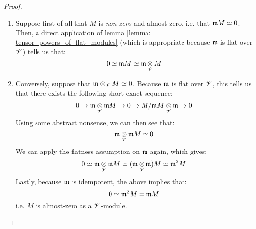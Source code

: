                     \begin{proof}
                        \noindent
                        \begin{enumerate}
                            \item Suppose first of all that $M$ is \textit{non-zero} and almost-zero, i.e. that $\mathfrak{m} M \simeq 0$. Then, a direct application of lemma \ref{lemma: tensor_powers_of_flat_modules} (which is appropriate because $\mathfrak{m}$ is flat over $\mathscr{V}$) tells us that:
                                $$0 \cong \m M \cong \m \tensor_{\scrV} M$$
                            \item Conversely, suppose that $\m \tensor_{\scrV} M \cong 0$. Because $\mathfrak{m}$ is flat over $\mathscr{V}$, this tells us that there exists the following short exact sequence:
                                $$0 \to \m \tensor_{\scrV} \m M \to 0 \to M/\m M \tensor_{\scrV} \m \to 0$$
                            Using some abstract nonsense, we can then see that:
                                $$\m \tensor_{\scrV} \m M \cong 0$$
                            We can apply the flatness assumption on $\mathfrak{m}$ again, which gives:
                                $$0 \cong \m \tensor_{\scrV} \m M \cong (\m \tensor_{\scrV} \m) M \cong \m^2 M$$
                            Lastly, because $\mathfrak{m}$ is idempotent, the above implies that:
                                $$0 \simeq \mathfrak{m}^2 M = \mathfrak{m} M$$
                            i.e. $M$ is almost-zero as a $\mathscr{V}$-module.
                        \end{enumerate}
                    \end{proof}
                    
